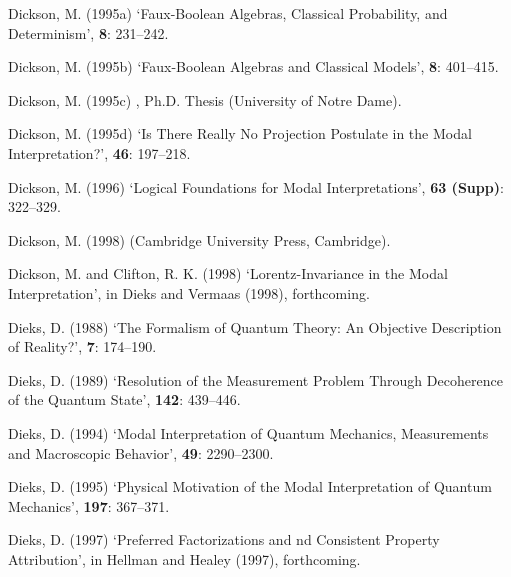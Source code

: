 \documentclass[12pt]{article}
\begin{document}
\begin{thebibliography}{10}
Dickson, M.  (1995a)
\newblock `Faux-Boolean Algebras, Classical Probability, and Determinism',
 {\bf 8}: 231--242.

Dickson, M. (1995b)
\newblock `Faux-Boolean Algebras and Classical Models',
 {\bf 8}: 401--415.

Dickson, M.  (1995c)
,
\newblock Ph.D. Thesis (University of Notre Dame).

Dickson, M.  (1995d)
\newblock `Is There Really No Projection Postulate in the Modal
Interpretation?',
{\bf 46}: 197--218.

Dickson, M.  (1996)
\newblock `Logical Foundations for Modal Interpretations',
 {\bf 63 (Supp)}: 322--329.

Dickson, M.  (1998)
 (Cambridge
University Press, Cambridge).

Dickson, M. and Clifton, R. K. (1998)
\newblock `Lorentz-Invariance in the Modal Interpretation',
\newblock in Dieks and Vermaas (1998), forthcoming.

Dieks, D.  (1988)
\newblock `The Formalism of Quantum Theory:  An Objective Description of
Reality?',
 {\bf 7}: 174--190.

Dieks, D.  (1989)
\newblock `Resolution of the Measurement Problem Through Decoherence of the
Quantum State',
 {\bf 142}: 439--446.

Dieks, D.  (1994)
\newblock `Modal Interpretation of Quantum Mechanics, Measurements and
Macroscopic Behavior',
 {\bf 49}: 2290--2300.

Dieks, D. (1995)
\newblock `Physical Motivation of the Modal Interpretation of Quantum
Mechanics',
 {\bf 197}: 367--371.

Dieks, D. (1997)
\newblock `Preferred Factorizations and nd Consistent Property Attribution',
\newblock in Hellman and Healey (1997), forthcoming.


\end{thebibliography}
\end{document}
